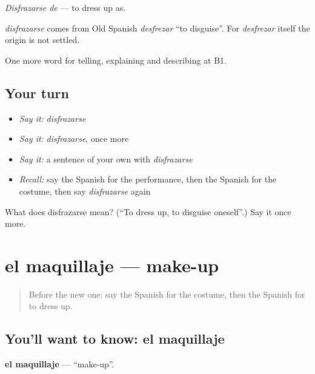 \emph{Disfrazarse de} — to dress up as.

\begin{cousinweb}
\emph{disfrazarse} comes from Old Spanish \emph{desfrezar} \textquotedblleft{}to disguise\textquotedblright{}. For \emph{desfrezar} itself the origin is not settled.
\end{cousinweb}

\begin{grammarlens}[title={What you've built}]
One more word for telling, explaining and describing at B1.
\end{grammarlens}

\subsection*{Your turn}
\begin{itemize}
\raggedright
  \item \emph{Say it:} \emph{disfrazarse}
  \item \emph{Say it:} \emph{disfrazarse}, once more
  \item \emph{Say it:} a sentence of your own with \emph{disfrazarse}
  \item \emph{Recall:} say the Spanish for the performance, then the Spanish for the costume, then say \emph{disfrazarse} again
\end{itemize}

\begin{tcolorbox}[breakable,colback=teal!4,colframe=teal!35!black,title={Before you move on}]
What does disfrazarse mean? (\textquotedblleft{}To dress up, to disguise oneself\textquotedblright{}.) Say it once more.
\end{tcolorbox}
\section[el maquillaje]{el maquillaje — make-up}

\label{lesson:ES-C760-maquillaje}



\begin{quote}
Before the new one: say the Spanish for the costume, then the Spanish for to dress up.
\end{quote}

\subsection*{You'll want to know: el maquillaje}
\textbf{el maquillaje} — \textquotedblleft{}make-up\textquotedblright{}.

